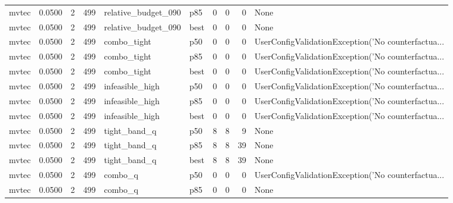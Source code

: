 \begin{tabular}{lrrrllrrrl}
   mvtec &    0.0500 &    2 &    499 &  relative\_budget\_090 &    p85 &               0 &          0 &       0 &                                               None \\
   mvtec &    0.0500 &    2 &    499 &  relative\_budget\_090 &   best &               0 &          0 &       0 &                                               None \\
   mvtec &    0.0500 &    2 &    499 &          combo\_tight &    p50 &               0 &          0 &       0 & UserConfigValidationException('No counterfactua... \\
   mvtec &    0.0500 &    2 &    499 &          combo\_tight &    p85 &               0 &          0 &       0 & UserConfigValidationException('No counterfactua... \\
   mvtec &    0.0500 &    2 &    499 &          combo\_tight &   best &               0 &          0 &       0 & UserConfigValidationException('No counterfactua... \\
   mvtec &    0.0500 &    2 &    499 &      infeasible\_high &    p50 &               0 &          0 &       0 & UserConfigValidationException('No counterfactua... \\
   mvtec &    0.0500 &    2 &    499 &      infeasible\_high &    p85 &               0 &          0 &       0 & UserConfigValidationException('No counterfactua... \\
   mvtec &    0.0500 &    2 &    499 &      infeasible\_high &   best &               0 &          0 &       0 & UserConfigValidationException('No counterfactua... \\
   mvtec &    0.0500 &    2 &    499 &         tight\_band\_q &    p50 &               8 &          8 &       9 &                                               None \\
   mvtec &    0.0500 &    2 &    499 &         tight\_band\_q &    p85 &               8 &          8 &      39 &                                               None \\
   mvtec &    0.0500 &    2 &    499 &         tight\_band\_q &   best &               8 &          8 &      39 &                                               None \\
   mvtec &    0.0500 &    2 &    499 &              combo\_q &    p50 &               0 &          0 &       0 & UserConfigValidationException('No counterfactua... \\
   mvtec &    0.0500 &    2 &    499 &              combo\_q &    p85 &               0 &          0 &       0 &                                               None \\

\end{tabular}
